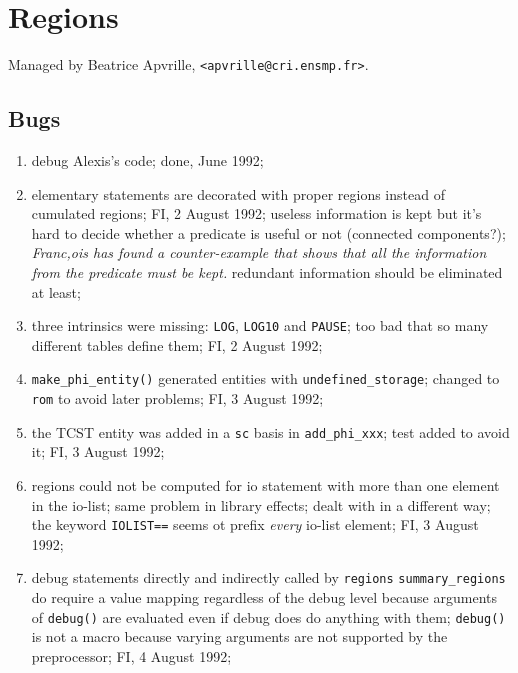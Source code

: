 \newpage

\section{Regions}

Managed by Beatrice Apvrille, \verb+<apvrille@cri.ensmp.fr>+.

\subsection{Bugs}

\begin{enumerate}

  \item debug Alexis's code; done, June 1992;

  \item elementary statements are decorated with proper regions
        instead of cumulated regions; FI, 2 August 1992;
        useless information is kept but it's hard to decide whether
        a predicate is useful or not (connected components?); {\em
        Franc,ois has found a counter-example that shows that all the 
        information from the predicate must be kept.\/}
        redundant information should be eliminated at least;

  \item three intrinsics were missing: \verb+LOG+, \verb+LOG10+ and
        \verb+PAUSE+; too bad that so many different tables define
        them; FI, 2 August 1992;

  \item \verb+make_phi_entity()+ generated entities with 
        \verb+undefined_storage+; changed to \verb+rom+ to avoid
        later problems; FI, 3 August 1992;

  \item the TCST entity was added in a \verb+sc+ basis in \verb+add_phi_xxx+;
        test added to avoid it; FI, 3 August 1992;

  \item regions could not be computed for io statement with more than
        one element in the io-list; same problem in library effects;
        dealt with in a different way; the keyword \verb+IOLIST==+
        seems ot prefix {\em every} io-list element; FI, 3 August 1992;

  \item debug statements directly and indirectly called by \verb+regions+
        \verb+summary_regions+ do require a value mapping regardless of
        the debug level because arguments of \verb+debug()+ are evaluated
        even if debug does do anything with them; \verb+debug()+ is not
        a macro because varying arguments are not supported by the
        preprocessor; FI, 4 August 1992;


\end{enumerate}
